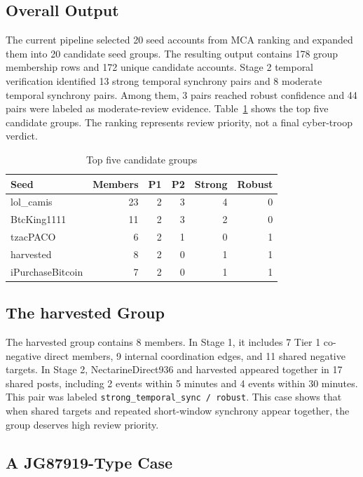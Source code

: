 \documentclass[conference]{IEEEtran}
\begin{document}
\subsection{Overall Output}

The current pipeline selected 20 seed accounts from MCA ranking and expanded them into 20 candidate seed groups. The resulting output contains 178 group membership rows and 172 unique candidate accounts. Stage 2 temporal verification identified 13 strong temporal synchrony pairs and 8 moderate temporal synchrony pairs. Among them, 3 pairs reached robust confidence and 44 pairs were labeled as moderate-review evidence. Table~\ref{tab:top-groups-en} shows the top five candidate groups. The ranking represents review priority, not a final cyber-troop verdict.

\begin{table}[htbp]
\centering
\caption{Top five candidate groups}
\label{tab:top-groups-en}
\small
\begin{tabular}{lrrrrr}
\toprule
Seed & Members & P1 & P2 & Strong & Robust \\
\midrule
lol\_camis & 23 & 2 & 3 & 4 & 0 \\
BtcKing1111 & 11 & 2 & 3 & 2 & 0 \\
tzacPACO & 6 & 2 & 1 & 0 & 1 \\
harvested & 8 & 2 & 0 & 1 & 1 \\
iPurchaseBitcoin & 7 & 2 & 0 & 1 & 1 \\
\bottomrule
\end{tabular}
\end{table}

\subsection{The harvested Group}

The harvested group contains 8 members. In Stage 1, it includes 7 Tier 1 co-negative direct members, 9 internal coordination edges, and 11 shared negative targets. In Stage 2, NectarineDirect936 and harvested appeared together in 17 shared posts, including 2 events within 5 minutes and 4 events within 30 minutes. This pair was labeled \texttt{strong\_temporal\_sync / robust}. This case shows that when shared targets and repeated short-window synchrony appear together, the group deserves high review priority.

\subsection{A JG87919-Type Case}
\end{document}
